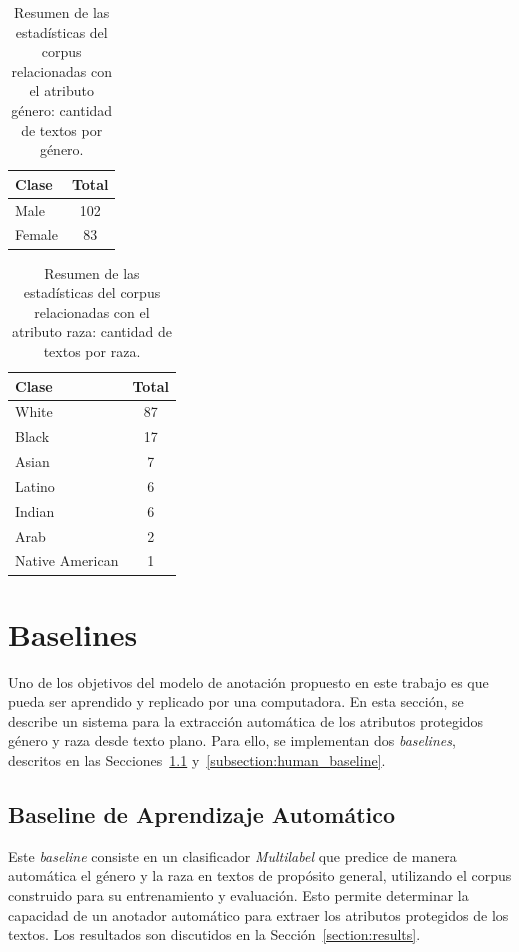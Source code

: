 \begin{table}[htpb]
    \centering
        \begin{tabular}{lc}
        \toprule
          \textbf{Clase} & \textbf{Total} \\
        \midrule
                    Male & 102 \\
                  Female & 83 \\

        \bottomrule
        \end{tabular}
    \caption{Resumen de las estad\'isticas del corpus relacionadas con el atributo g\'enero: cantidad de textos por g\'enero.}
    \label{table:stats_gen}
\end{table}

\begin{table}[htpb]
    \centering
        \begin{tabular}{lc}
        \toprule
            \textbf{Clase} & \textbf{Total} \\
        \midrule
                     White & 87 \\
                     Black & 17 \\
                     Asian & 7 \\
                    Latino & 6 \\
                    Indian & 6 \\
                      Arab & 2 \\
           Native American & 1 \\

        \bottomrule
        \end{tabular}
    \caption{Resumen de las estad\'isticas del corpus relacionadas con el atributo raza: cantidad de textos por raza.}
    \label{table:stats_race}
\end{table}

\section{Baselines}\label{section:baseline}
Uno de los objetivos del modelo de anotaci\'on propuesto en este trabajo es que pueda ser aprendido 
y replicado por una computadora. En esta secci\'on, se describe un sistema para la extracci\'on
autom\'atica de los atributos protegidos g\'enero y raza desde texto plano. Para ello, se 
implementan dos \emph{baselines}, descritos en las Secciones~\ref{subsection:ml_baseline} 
y~\ref{subsection:human_baseline}.

\subsection{Baseline de Aprendizaje Autom\'atico}\label{subsection:ml_baseline}
Este \emph{baseline} consiste en un clasificador \emph{Multilabel}  que predice 
de manera autom\'atica el g\'enero y la raza en textos de prop\'osito general, utilizando el corpus construido 
para su entrenamiento y evaluaci\'on. Esto permite determinar la capacidad de un anotador autom\'atico para 
extraer los atributos protegidos de los textos. Los resultados son discutidos en la Secci\'on~\ref{section:results}.

